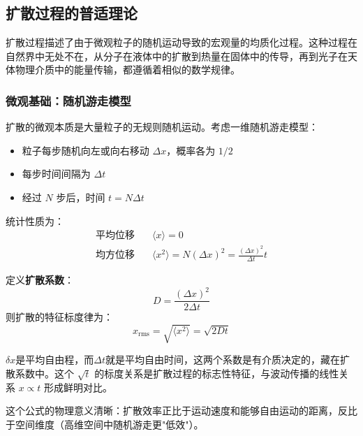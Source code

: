 
\subsection{扩散过程的普适理论}


扩散过程描述了由于微观粒子的随机运动导致的宏观量的均质化过程。这种过程在自然界中无处不在，从分子在液体中的扩散到热量在固体中的传导，再到光子在天体物理介质中的能量传输，都遵循着相似的数学规律。

\subsubsection*{微观基础：随机游走模型}

扩散的微观本质是大量粒子的无规则随机运动。考虑一维随机游走模型：
\begin{itemize}
  \item 粒子每步随机向左或向右移动 $\Delta x$，概率各为 $1/2$
  \item 每步时间间隔为 $\Delta t$
  \item 经过 $N$ 步后，时间 $t = N\Delta t$
\end{itemize}

统计性质为：
\begin{align*}
\text{平均位移} &\quad \langle x \rangle = 0 \\
\text{均方位移} &\quad \langle x^2 \rangle = N(\Delta x)^2 = \frac{(\Delta x)^2}{\Delta t} t
\end{align*}

定义\textbf{扩散系数}：
\[
D = \frac{(\Delta x)^2}{2\Delta t}
\]
则扩散的特征标度律为：
\[
\boxed{x_{\text{rms}} = \sqrt{\langle x^2 \rangle} = \sqrt{2Dt}}
\]

$\delta x$是平均自由程，而$\Delta t$就是平均自由时间，这两个系数是有介质决定的，藏在扩散系数中。这个 $\sqrt{t}$ 的标度关系是扩散过程的标志性特征，与波动传播的线性关系 $x \propto t$ 形成鲜明对比。



这个公式的物理意义清晰：扩散效率正比于运动速度和能够自由运动的距离，反比于空间维度（高维空间中随机游走更"低效"）。

